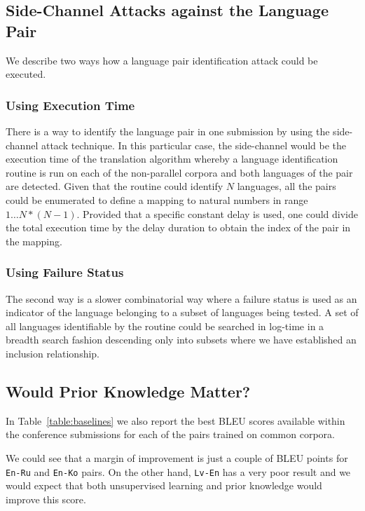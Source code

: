 \documentclass[]{article}
\begin{document}
\subsection{Side-Channel Attacks against the Language Pair}
\label{sect:attack}

We describe two ways how a language pair identification attack could be executed.

\subsubsection{Using Execution Time}

There is a way to identify the language pair in one submission by using the side-channel attack technique.
In this particular case, the side-channel would be the execution time of the translation algorithm whereby a language identification routine is run on each of the non-parallel corpora and both languages of the pair are detected.
Given that the routine could identify $N$ languages, all the pairs could be enumerated to define a mapping to natural numbers in range $1\dots N*(N-1)$.
Provided that a specific constant delay is used, one could divide the total execution time by the delay duration to obtain the index of the pair in the mapping.

\subsubsection{Using Failure Status}

The second way is a slower combinatorial way where a failure status is used as an indicator of the language belonging to a subset of languages being tested.
A set of all languages identifiable by the routine could be searched in log-time in a breadth search fashion descending only into subsets where we have established an inclusion relationship.

\subsection{Would Prior Knowledge Matter?}
\label{sect:prior}

In Table~\ref{table:baselines} we also report the best BLEU scores available within the conference submissions for each of the pairs trained on common corpora.

We could see that a margin of improvement is just a couple of BLEU points for {\tt En-Ru} and {\tt En-Ko} pairs.
On the other hand, {\tt Lv-En} has a very poor result and we would expect that both unsupervised learning and prior knowledge would improve this score.
\end{document}

